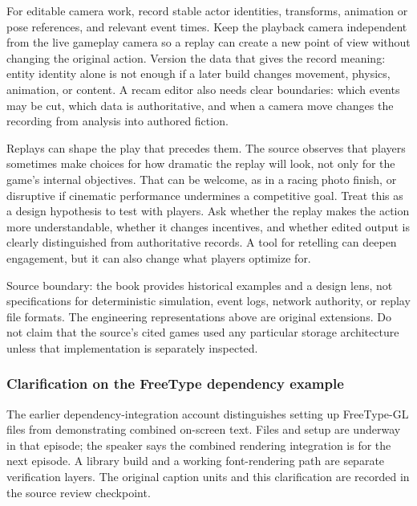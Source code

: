 For editable camera work, record stable actor identities, transforms, animation or pose references, and relevant event times. Keep the playback camera independent from the live gameplay camera so a replay can create a new point of view without changing the original action. Version the data that gives the record meaning: entity identity alone is not enough if a later build changes movement, physics, animation, or content. A recam editor also needs clear boundaries: which events may be cut, which data is authoritative, and when a camera move changes the recording from analysis into authored fiction.

Replays can shape the play that precedes them. The source observes that players sometimes make choices for how dramatic the replay will look, not only for the game's internal objectives. That can be welcome, as in a racing photo finish, or disruptive if cinematic performance undermines a competitive goal. Treat this as a design hypothesis to test with players. Ask whether the replay makes the action more understandable, whether it changes incentives, and whether edited output is clearly distinguished from authoritative records. A tool for retelling can deepen engagement, but it can also change what players optimize for.

Source boundary: the book provides historical examples and a design lens, not specifications for deterministic simulation, event logs, network authority, or replay file formats. The engineering representations above are original extensions. Do not claim that the source's cited games used any particular storage architecture unless that implementation is separately inspected.

\subsubsection{Clarification on the FreeType dependency example}\label{06-engine-ii-ch046-clarification-on-the-freetype-dependency-example}

\hypertarget{06-engine-ii-ch046-clarification-on-the-freetype-dependency-example}{}

The earlier dependency-integration account distinguishes setting up FreeType-GL files from demonstrating combined on-screen text. Files and setup are underway in that episode; the speaker says the combined rendering integration is for the next episode. A library build and a working font-rendering path are separate verification layers. The original caption units and this clarification are recorded in the source review checkpoint.

